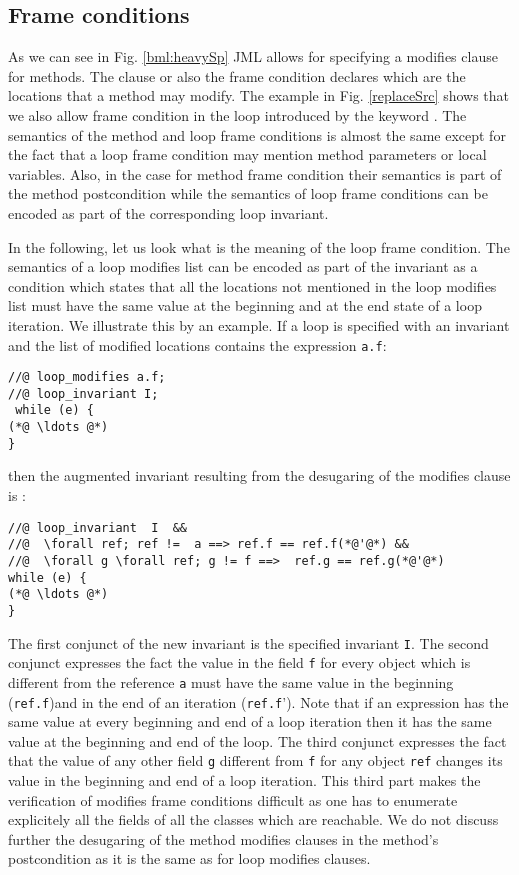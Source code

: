 \subsection{Frame conditions}\label{javaVerif:JML:frame}

As we can see in Fig. \ref {bml:heavySp} JML allows for specifying a modifies clause for methods. 
The \modifies{} clause or also the frame condition declares which are the locations that a method may modify.
The example in Fig. \ref{replaceSrc} shows that we also allow frame condition in the loop introduced by the keyword \loopMod.
The semantics of the method and loop frame conditions is almost the same except for the fact that a loop frame condition  may mention 
method parameters or local variables.  Also, in the case for method frame condition their semantics is part of the method postcondition 
while the semantics of  loop frame conditions can be encoded as part of the corresponding loop invariant.

In the following, let us look what is the meaning of the loop frame condition.
The semantics of a loop modifies list can be encoded as part of the invariant as a condition which states
that all the locations not mentioned in the  loop modifies list must have the same value at the beginning and at the end state of a loop iteration.
We illustrate this by an example. If a loop is specified with an invariant \invariant{} and the list of modified locations contains the expression \lstinline!a.f!:
\begin{lstlisting}[frame=trbl]
//@ loop_modifies a.f;
//@ loop_invariant I;
 while (e) {
(*@ \ldots @*)
} 
\end{lstlisting}
 then the augmented invariant resulting from the desugaring of the modifies clause is  : 
\begin{lstlisting}[frame=trbl]
//@ loop_invariant  I  &&
//@  \forall ref; ref !=  a ==> ref.f == ref.f(*@'@*) && 
//@  \forall g \forall ref; g != f ==>  ref.g == ref.g(*@'@*)
while (e) {
(*@ \ldots @*)
} 
\end{lstlisting}
The first conjunct of the new invariant is the specified invariant \lstinline!I!. The second conjunct expresses the fact the value in the field  \lstinline!f!
for every object which is different from the reference  \lstinline!a!  must have the same value in the beginning (\lstinline!ref.f!)and in the end of an iteration (\lstinline!ref.f!').
 Note that if an expression has the same value at every  beginning and end of a loop iteration then it has the same value at the beginning and end of the loop.   
The third conjunct expresses the fact that the value of any other field  \lstinline!g! different from  \lstinline!f! for any object 
 \lstinline!ref! changes its value in the beginning and end of a loop iteration.
This third part makes the verification of modifies frame conditions difficult as one has to enumerate explicitely all the fields of all the classes which are reachable.
We do not discuss further the desugaring of the method modifies clauses in the method's postcondition as it is the same as for loop modifies clauses. 

